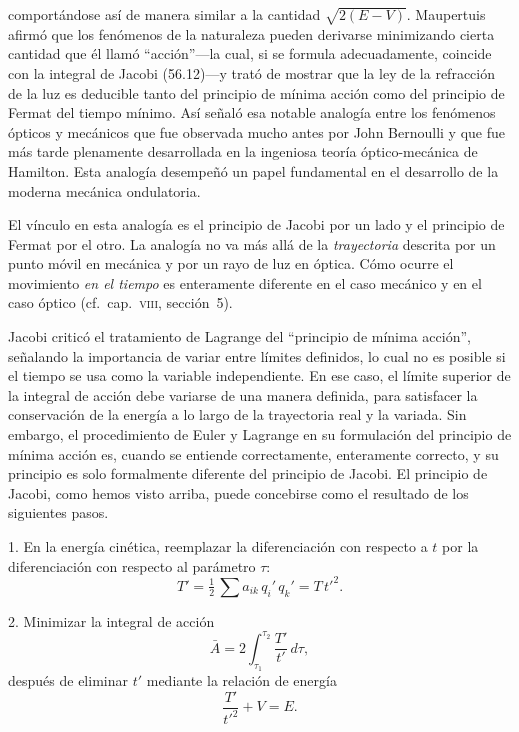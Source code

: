 \documentclass[12pt,a4paper]{book}
\begin{document}

comportándose así de manera similar a la cantidad $\sqrt{2(E-V)}$. Maupertuis afirmó que los fenómenos de la naturaleza pueden derivarse minimizando cierta cantidad que él llamó ``acción''---la cual, si se formula adecuadamente, coincide con la integral de Jacobi (56.12)---y trató de mostrar que la ley de la refracción de la luz es deducible tanto del principio de mínima acción como del principio de Fermat del tiempo mínimo. Así señaló esa notable analogía entre los fenómenos ópticos y mecánicos que fue observada mucho antes por John Bernoulli y que fue más tarde plenamente desarrollada en la ingeniosa teoría óptico-mecánica de Hamilton. Esta analogía desempeñó un papel fundamental en el desarrollo de la moderna mecánica ondulatoria.

El vínculo en esta analogía es el principio de Jacobi por un lado y el principio de Fermat por el otro. La analogía no va más allá de la \textit{trayectoria} descrita por un punto móvil en mecánica y por un rayo de luz en óptica. Cómo ocurre el movimiento \textit{en el tiempo} es enteramente diferente en el caso mecánico y en el caso óptico (cf.\ cap.~\textsc{viii}, sección~5).

Jacobi criticó el tratamiento de Lagrange del ``principio de mínima acción'', señalando la importancia de variar entre límites definidos, lo cual no es posible si el tiempo se usa como la variable independiente. En ese caso, el límite superior de la integral de acción debe variarse de una manera definida, para satisfacer la conservación de la energía a lo largo de la trayectoria real y la variada. Sin embargo, el procedimiento de Euler y Lagrange en su formulación del principio de mínima acción es, cuando se entiende correctamente, enteramente correcto, y su principio es solo formalmente diferente del principio de Jacobi. El principio de Jacobi, como hemos visto arriba, puede concebirse como el resultado de los siguientes pasos.

1. En la energía cinética, reemplazar la diferenciación con respecto a $t$ por la diferenciación con respecto al parámetro $\tau$:
\begin{equation}
T' = \tfrac{1}{2}\,\sum a_{ik}\,q_i'\,q_k' = T\,t'^2. \tag{56.14}
\end{equation}


2. Minimizar la integral de acción
\begin{equation}
\bar{A} = 2\int_{\tau_1}^{\tau_2} \frac{T'}{t'}\,d\tau, \tag{56.15}
\end{equation}
después de eliminar $t'$ mediante la relación de energía
\begin{equation}
\frac{T'}{t'^2} + V = E. \tag{56.16}
\end{equation}
\end{document}
